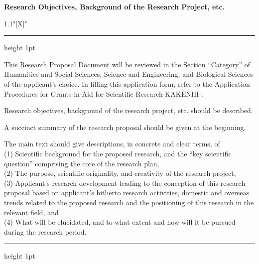 \documentclass[8pt]{extarticle}
\makeatletter
\newcommand{\thickhline}{%
	\noalign {\ifnum 0=`}\fi \hrule height 1pt
	\futurelet \reserved@a \@xhline
}
\makeatother
\begin{document}
	
\noindent\textbf{\fontsize{12}{12}\selectfont Research Objectives, Background of the Research Project, etc.}\\
\begin{tabularx}{1.1\linewidth}{"|X|"}
	\thickhline
	This Research Proposal Document will be reviewed in the Section ``Category'' of Humanities and Social Sciences, Science and Engineering, and Biological Sciences of the applicant's choice. In filling this application form, refer to the Application Procedures for Grants-in-Aid for Scientific Research-KAKENHI-.
	
	Research objectives, background of the research project, etc. should be described.
	
	A succinct summary of the research proposal should be given at the beginning.
	
	The main text should give descriptions, in concrete and clear terms, of\\
	(1) Scientific background for the proposed research, and the ``key scientific question'' comprising the core of the research plan,\\
	(2) The purpose, scientific originality, and creativity of the research project,\\
	(3) Applicant's research development leading to the conception of this research proposal based on applicant’s hitherto research activities, domestic and overseas trends related to the proposed research and the positioning of this research in the relevant field, and\\
	(4) What will be elucidated, and to what extent and how will it be pursued during the research period. 
	\\
	\thickhline
\end{tabularx}
\end{document}
